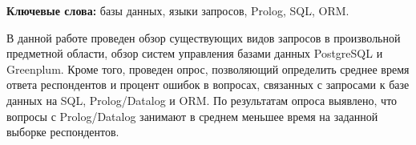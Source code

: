 \begin{essay}{}

\textbf{Ключевые слова:} базы данных, языки запросов, Prolog, SQL, ORM.

В данной работе проведен обзор существующих видов запросов в произвольной предметной области, обзор систем управления базами данных PostgreSQL и Greenplum. Кроме того, проведен опрос, позволяющий определить среднее время ответа респондентов и процент ошибок в вопросах, связанных с запросами к базе данных на SQL, Prolog/Datalog и ORM. По результатам опроса выявлено, что вопросы с Prolog/Datalog занимают в среднем меньшее время на заданной выборке респондентов.

\end{essay}